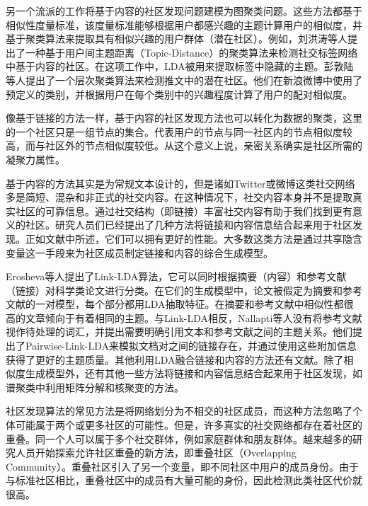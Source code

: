 另一个流派的工作将基于内容的社区发现问题建模为图聚类问题。这些方法都基于相似性度量标准，该度量标准能够根据用户都感兴趣的主题计算用户的相似度，并基于聚类算法来提取具有相似兴趣的用户群体（潜在社区）。例如，刘洪涛等人\cite{Liu2014Community}提出了一种基于用户间主题距离（Topic-Distance）的聚类算法来检测社交标签网络中基于内容的社区。在这项工作中，LDA被用来提取标签中隐藏的主题。彭敦陆等人\cite{Peng2015DICH}提出了一个层次聚类算法来检测推文中的潜在社区。他们在新浪微博中使用了预定义的类别，并根据用户在每个类别中的兴趣程度计算了用户的配对相似度。

像基于链接的方法一样，基于内容的社区发现方法也可以转化为数据的聚类，这里的一个社区只是一组节点的集合。代表用户的节点与同一社区内的节点相似度较高，而与社区外的节点相似度较低。从这个意义上说，亲密关系确实是社区所需的凝聚力属性。

基于内容的方法其实是为常规文本设计的，但是诸如Twitter或微博这类社交网络多是简短、混杂和非正式的社交内容。在这种情况下，社交内容本身并不是提取真实社区的可靠信息\cite{Yang2009Combining}。通过社交结构（即链接）丰富社交内容有助于我们找到更有意义的社区。研究人员们已经提出了几种方法将链接和内容信息结合起来用于社区发现。正如文献\cite{Cohn2001The,Getoor2003Learning}中所述，它们可以拥有更好的性能。大多数这类方法是通过共享隐含变量这一手段来为社区成员制定链接和内容的综合生成模型。

Erosheva等人\cite{Erosheva2004Mixed}提出了Link-LDA算法，它可以同时根据摘要（内容）和参考文献（链接）对科学类论文进行分类。在它们的生成模型中，论文被假定为摘要和参考文献的一对模型，每个部分都用LDA抽取特征。在摘要和参考文献中相似性都很高的文章倾向于有着相同的主题。与Link-LDA相反，Nallapti等人\cite{Nallapati2008Joint}没有将参考文献视作待处理的词汇，并提出需要明确引用文本和参考文献之间的主题关系。他们提出了Pairwise-Link-LDA来模拟文档对之间的链接存在，并通过使用这些附加信息获得了更好的主题质量。其他利用LDA融合链接和内容的方法还有文献\cite{Dietz2007Unsupervised,Gruber2008Latent}。除了相似度生成模型外，还有其他一些方法将链接和内容信息结合起来用于社区发现，如谱聚类中利用矩阵分解和核聚变的方法\cite{Zhu2007Combining,Yu2008Clustering}。

社区发现算法的常见方法是将网络划分为不相交的社区成员，而这种方法忽略了个体可能属于两个或更多社区的可能性。但是，许多真实的社交网络都存在着社区的重叠\cite{Xie2013Overlapping}。同一个人可以属于多个社交群体，例如家庭群体和朋友群体。越来越多的研究人员开始探索允许社区重叠的新方法，即重叠社区（Overlapping Community）。重叠社区引入了另一个变量，即不同社区中用户的成员身份。由于与标准社区相比，重叠社区中的成员有大量可能的身份，因此检测此类社区代价就很高。

